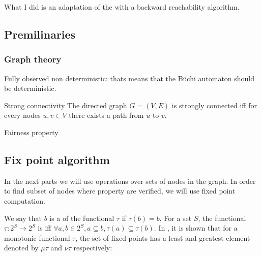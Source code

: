 What I did is an adaptation of the \cite{fu2011simple} with a backward reachability algorithm.

\subsection{Premilinaries}

\subsubsection{Graph theory}
Fully observed non deterministic: thats means that the B\"uchi automaton should be deterministic.

\begin{nameddef}{Strong connectivity}
The directed graph $G = (V,E)$ is strongly connected iff for every nodes $u,v \in V$ there exists a path from $u$ to $v$.
\end{nameddef}


\begin{nameddef}{Fairness property}

\end{nameddef}

\subsection{Fix point algorithm}

In the next parts we will use operations over sets of nodes in the graph. In order to find subset of nodes where property are verified, we will use fixed point computation.

We say that $b$ is a  of the functional $\tau$ if $\tau(b) = b$.
For a set $S$, the functional $\tau: 2^S \rightarrow 2^S$ is   iff $\forall a,b \in 2^S, a \subseteq b, \tau(a) \subseteq \tau(b)$.
In \cite{tarski}, it is shown that for a monotonic functional $\tau$,
the set of fixed points has a least and greatest element denoted by $\mu \tau$ and $\nu \tau$ respectively:


